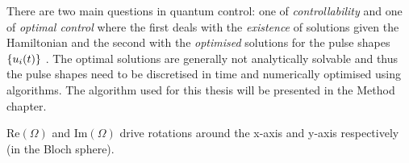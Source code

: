 \documentclass[main.tex]{subfiles}
\begin{document}
There are two main questions in quantum control: one of \emph{controllability} and one of \emph{optimal control} where the first deals with the \emph{existence} of solutions given the Hamiltonian and the second with the \emph{optimised} solutions for the pulse shapes \(\qty{u_i(t)}\) \autocite{dalessandro_introduction_2007}. The optimal solutions are generally not analytically solvable and thus the pulse shapes need to be discretised in time  and numerically optimised using algorithms. The algorithm used for this thesis will be presented in the Method chapter.


\(\text{Re}(\Omega)\) and \(\text{Im}(\Omega)\) drive rotations around the x-axis and y-axis respectively (in the Bloch sphere). 
\end{document}
